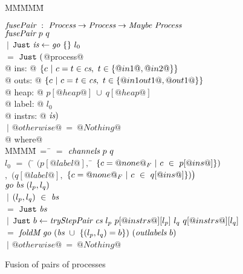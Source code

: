 
\begin{figure}

\begin{tabbing}
M\=M\=M\=M\=M\kill

$\textit{fusePair} ~:~ \textit{Process} \to \textit{Process} \to  \textit{Maybe}~\textit{Process}$ \\
$\textit{fusePair}~p~q$ \\
\> $~|$ \> $\texttt{Just}~ \textit{is} \gets \textit{go}~\{  \}~l_0$ \\
\> $=$ \> $\texttt{Just}~ ($@process@ \\
@             ins: @ $\{ c~|~c=t \in \textit{cs},~t \in \{ @in1@,@in2@ \} \} $ \\
@            outs: @ $\{ c~|~c=t \in \textit{cs},~t \in \{ @in1out1@,@out1@ \} \} $ \\
@            heap: @ $p[@heap@]~\cup~q[@heap@]$ \\
@           label: @ $l_0$ \\
@          instrs: @ $\textit{is})$ \\
\> $~|$ \> $@otherwise@~=~@Nothing@$ \\
@ where@ \\
M\=MM\=M\=~=~\=\kill
 \> \cs \> $=$ \> $\textit{channels}~p~q$ \\[0.5ex]

 \> $l_0$  \> $=$ \> $
      \big($ \= $(p[@label@],$ \= $\{ c=@none@_F~|~c~\in~p[@ins@] \})$
\\ \> \> \>$,$ \> $(q[@label@],$ \> $\{ c=@none@_F~|~c~\in~q[@ins@] \})
      \big)$ \\[0.5ex]

 \> $\textit{go}~\textit{bs}~(l_p,l_q)$ \\
 \> \> $~|$ \> $(l_p,l_q)~\in~\textit{bs}$ \\
 \> \> $=$ \> $\texttt{Just}~\textit{bs}$ \\[0.5ex]
 \> \> $~|$ \> $\texttt{Just}~ b \gets \textit{tryStepPair}~\textit{cs}~l_p~p[@instrs@][l_p]~l_q~q[@instrs@][l_q]$ \\ 
 \> \> $=$ \> $\textit{foldM}~\textit{go}~(\textit{bs}~\cup~\{ (l_p,l_q)=b \})~(\textit{outlabels}~b)$ \\[0.5ex]
 \> \> $~|$ \> $@otherwise@~=~@Nothing@$
\end{tabbing}

\caption{Fusion of pairs of processes}


\label{fig:Fusion:Def:Top}
\end{figure}



